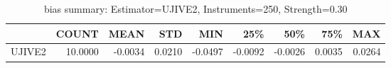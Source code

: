 \begin{table}[ht]
\centering
\caption{bias summary: Estimator=UJIVE2, Instruments=250, Strength=0.30}
\begin{tabular}{lrrrrrrrr}
\toprule
 & COUNT & MEAN & STD & MIN & 25\% & 50\% & 75\% & MAX \\
\midrule
UJIVE2 & 10.0000 & -0.0034 & 0.0210 & -0.0497 & -0.0092 & -0.0026 & 0.0035 & 0.0264 \\
\bottomrule
\end{tabular}
\end{table}

